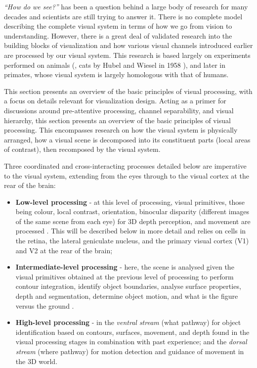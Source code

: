 \emph{``How do we see?''} has been a question behind a large body of research for many decades and scientists are still trying to answer it. 
There is no complete model describing the complete visual system in terms of how we go from vision to understanding.
However, there is a great deal of validated research into the building blocks of visualization and how various visual channels introduced earlier are processed by our visual system.
This research is based largely on experiments performed on animals (\eg, cats by Hubel and Wiesel in 1958 \cite{hubel1959receptive}), and later in primates, whose visual system is largely homologous with that of humans. 

This section presents an overview of the basic principles of visual processing, with a focus on details relevant for visualization design.
Acting as a primer for discussions around pre-attentive processing, channel separability, and visual hierarchy, this section presents an overview of the basic principles of visual processing.
This encompasses research on how the visual system is physically arranged, how a visual scene is decomposed into its constituent parts (local areas of contrast), then recomposed by the visual system.

Three coordinated and cross-interacting processes detailed below are imperative to the visual system, extending from the eyes through to the visual cortex at the rear of the brain:  
\begin{itemize}
\item \textbf{Low-level processing} - at this level of processing, visual primitives, those being colour, local contrast, orientation, binocular disparity (different images of the same scene from each eye) for 3D depth perception, and movement are processed \cite{kandel2012principles}.
This will be described below in more detail and relies on cells in the retina, the lateral geniculate nucleus, and the primary visual cortex (V1) and V2 at the rear of the brain;
\item \textbf{Intermediate-level processing} - here, the scene is analysed given the visual primitives obtained at the previous level of processing to perform contour integration, identify object boundaries, analyse surface properties, depth and segmentation, determine object motion, and what is the figure versus the ground \cite{kandel2012principles}.
\item \textbf{High-level processing} - in the \emph{ventral stream} (what pathway) for object identification based on contours, surfaces, movement, and depth found in the visual processing stages in combination with past experience; and the \emph{dorsal stream} (where pathway) for motion detection and guidance of movement in the 3D world.
\end{itemize}

